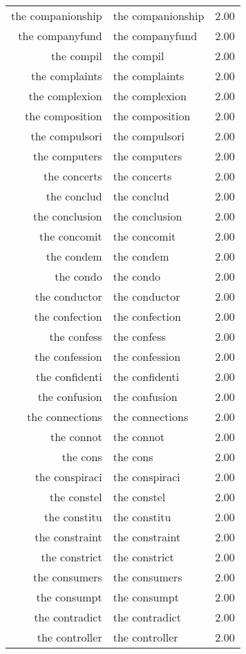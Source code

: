 \begin{table}[ht]
\begin{tabular}{rlr}
  the companionship & the companionship & 2.00 \\ 
  the companyfund & the companyfund & 2.00 \\ 
  the compil & the compil & 2.00 \\ 
  the complaints & the complaints & 2.00 \\ 
  the complexion & the complexion & 2.00 \\ 
  the composition & the composition & 2.00 \\ 
  the compulsori & the compulsori & 2.00 \\ 
  the computers & the computers & 2.00 \\ 
  the concerts & the concerts & 2.00 \\ 
  the conclud & the conclud & 2.00 \\ 
  the conclusion & the conclusion & 2.00 \\ 
  the concomit & the concomit & 2.00 \\ 
  the condem & the condem & 2.00 \\ 
  the condo & the condo & 2.00 \\ 
  the conductor & the conductor & 2.00 \\ 
  the confection & the confection & 2.00 \\ 
  the confess & the confess & 2.00 \\ 
  the confession & the confession & 2.00 \\ 
  the confidenti & the confidenti & 2.00 \\ 
  the confusion & the confusion & 2.00 \\ 
  the connections & the connections & 2.00 \\ 
  the connot & the connot & 2.00 \\ 
  the cons & the cons & 2.00 \\ 
  the conspiraci & the conspiraci & 2.00 \\ 
  the constel & the constel & 2.00 \\ 
  the constitu & the constitu & 2.00 \\ 
  the constraint & the constraint & 2.00 \\ 
  the constrict & the constrict & 2.00 \\ 
  the consumers & the consumers & 2.00 \\ 
  the consumpt & the consumpt & 2.00 \\ 
  the contradict & the contradict & 2.00 \\ 
  the controller & the controller & 2.00 \\ 

\end{tabular}
\end{table}
